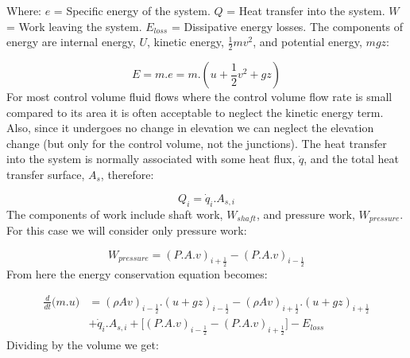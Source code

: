 \documentclass[11pt,letterpaper,titlepage]{article}
\newcommand{\half}{\frac{1}{2}}
\begin{document}
\noindent 
Where: 
\newline \noindent $e$ \quad = Specific energy of the system.
\newline \noindent $Q$ \quad = Heat transfer into the system.
\newline \noindent $W$ \quad = Work leaving the system.
\newline \noindent $E_{loss}$ \quad = Dissipative energy losses.
\newline
\newline
The components of energy are internal energy, $U$, kinetic energy, $\half mv^2$, and potential energy, $mgz$:

\begin{equation*}
E= m.e = m.(u+\half v^2+gz)
\end{equation*}
\newline
For most control volume fluid flows where the control volume flow rate is small compared to its area it is often acceptable to neglect the kinetic energy term. Also, since it undergoes no change in elevation we can neglect the elevation change (but only for the control volume, not the junctions).
\newline
\newline
The heat transfer into the system is normally associated with some heat flux, $\dot{q}$, and the total heat transfer surface, $A_s$, therefore:

\begin{equation*}
Q_i=\dot{q}_i.A_{s,i}
\end{equation*}
\newline
The components of work include shaft work, $W_{shaft}$, and pressure work, $W_{pressure}$. For this case we will consider only pressure work:

\begin{equation*}
W_{pressure}=(P.A.v)_{i+\half} - (P.A.v)_{i-\half} 
\end{equation*}
\newline
\noindent
From here the energy conservation equation becomes:

\begin{equation*}
\begin{aligned}
\frac{d}{dt} \biggr( m.u \biggr)&=(\rho Av)_{i-\half}.(u+gz)_{i-\half} - (\rho Av)_{i+\half}.(u+gz)_{i+\half} \\
&+\dot{q}_i.A_{s,i} + \biggr[   (P.A.v)_{i-\half} - (P.A.v)_{i+\half}   \biggr] - E_{loss}
\end{aligned}
\end{equation*}
\newline
\noindent
Dividing by the volume we get:
\end{document}
